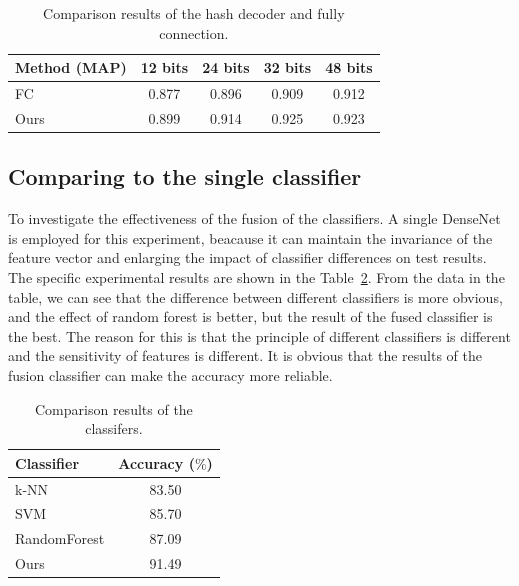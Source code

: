 \documentclass[12pt]{article}
\begin{document}
\begin{table}[ht]
  \renewcommand{\arraystretch}{1.3}
  \caption{Comparison results of the hash 
  decoder and fully connection.}
  \label{tab:tabHash}
  \begin{center}
  \begin{tabular}{|l|c|c|c|c|}
    \hline
        
        Method (MAP) & 12 bits & 24 bits & 32 bits & 48 bits \\
                
        \hline

        FC    & 0.877 & 0.896 & 0.909 & 0.912 \\       
        Ours  & 0.899 & 0.914 & 0.925 & 0.923 \\
        
        \hline
  \end{tabular}
  \end{center}
  \end{table}

\subsection{Comparing to the single classifier}
\label{ExpCls}

To investigate the effectiveness of the fusion
of the classifiers. A single DenseNet is employed
for this experiment, beacause it can maintain 
the invariance of the feature vector and enlarging 
the impact of classifier differences on test 
results. The specific 
experimental results are shown in the 
Table~\ref{tab:tabCls}. From the data in the 
table, we can see that the difference between 
different classifiers is more obvious, and 
the effect of random forest is better, but 
the result of the fused classifier is the best. 
The reason for this is that the principle of 
different classifiers is different and the 
sensitivity of features is different. It is 
obvious that the results of the fusion 
classifier can make the accuracy more reliable.

\begin{table}[ht]
  \renewcommand{\arraystretch}{1.3}
  \caption{Comparison results of the 
  classifers.}
  \label{tab:tabCls}
  \begin{center}
  \begin{tabular}{|l|c|}
    \hline
    
    Classifier & Accuracy ($\%$) \\
            
    \hline

    k-NN            & 83.50 \\ 
    SVM             & 85.70 \\ 
    RandomForest    & 87.09 \\ 
    Ours            & 91.49 \\
    
    \hline
  \end{tabular}
  \end{center}
  \end{table}
\end{document}

